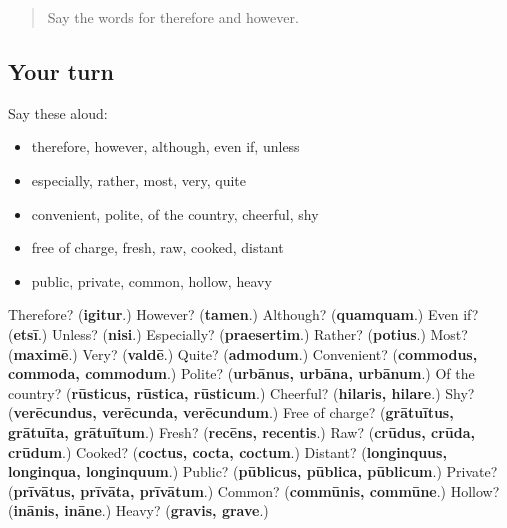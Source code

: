 \label{lesson:LA-R182-second-pass-words-from-chapters-178-182}



\begin{quote}
Say the words for therefore and however.
\end{quote}

\subsection*{Your turn}
Say these aloud:

\begin{itemize}
\raggedright
  \item therefore, however, although, even if, unless
  \item especially, rather, most, very, quite
  \item convenient, polite, of the country, cheerful, shy
  \item free of charge, fresh, raw, cooked, distant
  \item public, private, common, hollow, heavy
\end{itemize}

\begin{tcolorbox}[breakable,colback=teal!4,colframe=teal!35!black,title={Before you move on}]
Therefore? (\textbf{igitur}.) However? (\textbf{tamen}.) Although? (\textbf{quamquam}.) Even if? (\textbf{etsī}.) Unless? (\textbf{nisi}.) Especially? (\textbf{praesertim}.) Rather? (\textbf{potius}.) Most? (\textbf{maximē}.) Very? (\textbf{valdē}.) Quite? (\textbf{admodum}.) Convenient? (\textbf{commodus, commoda, commodum}.) Polite? (\textbf{urbānus, urbāna, urbānum}.) Of the country? (\textbf{rūsticus, rūstica, rūsticum}.) Cheerful? (\textbf{hilaris, hilare}.) Shy? (\textbf{verēcundus, verēcunda, verēcundum}.) Free of charge? (\textbf{grātuītus, grātuīta, grātuītum}.) Fresh? (\textbf{recēns, recentis}.) Raw? (\textbf{crūdus, crūda, crūdum}.) Cooked? (\textbf{coctus, cocta, coctum}.) Distant? (\textbf{longinquus, longinqua, longinquum}.) Public? (\textbf{pūblicus, pūblica, pūblicum}.) Private? (\textbf{prīvātus, prīvāta, prīvātum}.) Common? (\textbf{commūnis, commūne}.) Hollow? (\textbf{inānis, ināne}.) Heavy? (\textbf{gravis, grave}.)
\end{tcolorbox}
